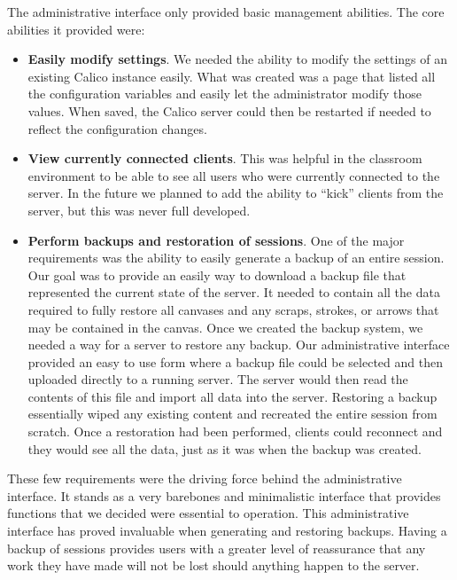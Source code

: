 The administrative interface only provided basic management abilities. The core abilities it provided were:
\begin{itemize}\itemsep1pt

\item
\textbf{Easily modify settings}.
We needed the ability to modify the settings of an existing Calico instance easily. What was created was a page that listed all the configuration variables and easily let the administrator modify those values. When saved, the Calico server could then be restarted if needed to reflect the configuration changes.

\item
\textbf{View currently connected clients}. 
This was helpful in the classroom environment to be able to see all users who were currently connected to the server. In the future we planned to add the ability to ``kick'' clients from the server, but this was never full developed.

\item
\textbf{Perform backups and restoration of sessions}.
One of the major requirements was the ability to easily generate a backup of an entire session. Our goal was to provide an easily way to download a backup file that represented the current state of the server. It needed to contain all the data required to fully restore all canvases and any scraps, strokes, or arrows that may be contained in the canvas. Once we created the backup system, we needed a way for a server to restore any backup. Our administrative interface provided an easy to use form where a backup file could be selected and then uploaded directly to a running server. The server would then read the contents of this file and import all data into the server. Restoring a backup essentially wiped any existing content and recreated the entire session from scratch. Once a restoration had been performed, clients could reconnect and they would see all the data, just as it was when the backup was created.

\end{itemize}

These few requirements were the driving force behind the administrative interface. It stands as a very barebones and minimalistic interface that provides functions that we decided were essential to operation. This administrative interface has proved invaluable when generating and restoring backups. Having a backup of sessions provides users with a greater level of reassurance that any work they have made will not be lost should anything happen to the server.



